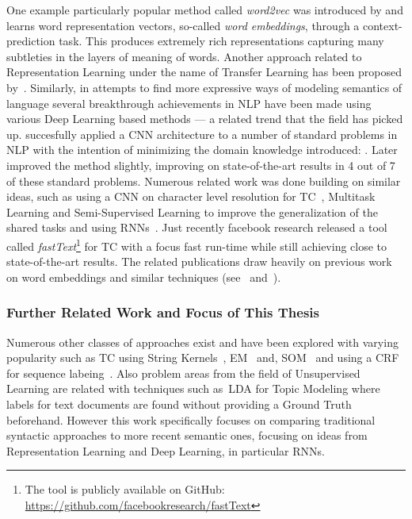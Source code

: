 One example particularly popular method called \emph{word2vec} was introduced by \cite{Mikolov:2013ad} and learns word representation vectors, so-called \emph{word embeddings}, through a context-prediction task. This produces extremely rich representations capturing many subtleties in the layers of meaning of words\cite{Mikolov:2013ab}. Another approach related to \gls{Representation Learning} under the name of Transfer Learning has been proposed by~\cite{Do:2006aa}. Similarly, in attempts to find more expressive ways of modeling semantics of language several breakthrough achievements in \acrshort{NLP} have been made using various \gls{Deep Learning} based methods --- a related trend that the field has picked up.
\cite{Collobert:2011aa} succesfully applied a \acrfull{CNN} architecture to a number of standard problems in \gls{NLP} with the intention of minimizing the domain knowledge introduced: .
Later~\cite{Kim:2014aa} improved the method slightly, improving on state-of-the-art results in 4 out of 7 of these standard problems. Numerous related work was done building on similar ideas, such as using a \acrshort{CNN} on character level resolution for \gls{TC}~\cite{Zhang:2015aa}, Multitask Learning and Semi-Supervised Learning to improve the generalization of the shared tasks\cite{Collobert:2008aa} and using \glspl{RNN}~\cite{Liu:2016aa}. Just recently facebook research released a tool called \emph{fastText}\footnote{The tool is publicly available on \gls{GitHub}: \url{https://github.com/facebookresearch/fastText}} for \gls{TC} with a focus fast run-time while still achieving close to state-of-the-art results. The related publications draw heavily on previous work on word embeddings and similar techniques (see~\cite{Joulin:2016aa} and~\cite{Bojanowski:2016aa}).

\subsubsection*{Further Related Work and Focus of This Thesis}
\label{subs:Further Related Work and Focus of This Thesis}

Numerous other classes of approaches exist and have been explored with varying popularity such as \gls{TC} using String Kernels~\cite{Lodhi:2002aa}, \gls{EM}~\cite{Nigam:2000aa} and\cite{McCallum:1999aa}, \gls{SOM}~\cite{Merkl:1998aa} and using a \gls{CRF} for sequence labeing~\cite{Lafferty:2001aa}.
Also problem areas from the field of \gls{Unsupervised Learning} are related with techniques such as~\gls{LDA} \cite{Blei:2003aa} for \gls{Topic Modeling} where labels for text documents are found without providing a \gls{Ground Truth} beforehand. However this work specifically focuses on comparing traditional syntactic approaches to more recent semantic ones, focusing on ideas from \gls{Representation Learning} and \gls{Deep Learning}, in particular \glspl{RNN}.

